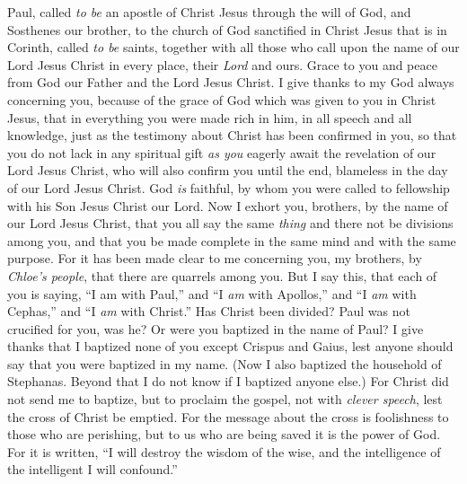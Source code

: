 
\begin{biblechapter} %
 Paul, called \textit{to be} an apostle of Christ Jesus through the will of God, and Sosthenes our brother,
\verse to the church of God sanctified in Christ Jesus that is in Corinth, called \textit{to be} saints, together with all those who call upon the name of our Lord Jesus Christ in every place, their \textit{Lord} and ours.
\verse Grace to you and peace from God our Father and the Lord Jesus Christ.
 I give thanks to my God always concerning you, because of the grace of God which was given to you in Christ Jesus,
\verse that in everything you were made rich in him, in all speech and all knowledge,
\verse just as the testimony about Christ has been confirmed in you,
\verse so that you do not lack in any spiritual gift \textit{as you} eagerly await the revelation of our Lord Jesus Christ,
\verse who will also confirm you until the end, blameless in the day of our Lord Jesus Christ.
\verse God \textit{is} faithful, by whom you were called to fellowship with his Son Jesus Christ our Lord.
 Now I exhort you, brothers, by the name of our Lord Jesus Christ, that you all say the same \textit{thing} and there not be divisions among you, and that you be made complete in the same mind and with the same purpose.
\verse For it has been made clear to me concerning you, my brothers, by \textit{Chloe’s people}, that there are quarrels among you.
\verse But I say this, that each of you is saying, “I am with Paul,” and “I \textit{am} with Apollos,” and “I \textit{am} with Cephas,” and “I \textit{am} with Christ.”
\verse Has Christ been divided? Paul was not crucified for you, was he? Or were you baptized in the name of Paul?
\verse I give thanks that I baptized none of you except Crispus and Gaius,
\verse lest anyone should say that you were baptized in my name.
\verse (Now I also baptized the household of Stephanas. Beyond that I do not know if I baptized anyone else.)
\verse For Christ did not send me to baptize, but to proclaim the gospel, not with \textit{clever speech}, lest the cross of Christ be emptied.
 For the message about the cross is foolishness to those who are perishing, but to us who are being saved it is the power of God.
\verse For it is written, “I will destroy the wisdom of the wise, 
and the intelligence of the intelligent I will confound.”

\end{biblechapter}
